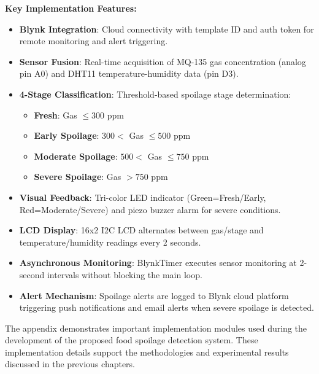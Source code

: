 \textbf{Key Implementation Features:}
\begin{itemize}
    \item \textbf{Blynk Integration}: Cloud connectivity with template ID and auth token for remote monitoring and alert triggering.
    \item \textbf{Sensor Fusion}: Real-time acquisition of MQ-135 gas concentration (analog pin A0) and DHT11 temperature-humidity data (pin D3).
    \item \textbf{4-Stage Classification}: Threshold-based spoilage stage determination:
    \begin{itemize}
        \item \textbf{Fresh}: Gas $\leq 300$ ppm
        \item \textbf{Early Spoilage}: $300 < $ Gas $\leq 500$ ppm
        \item \textbf{Moderate Spoilage}: $500 < $ Gas $\leq 750$ ppm
        \item \textbf{Severe Spoilage}: Gas $> 750$ ppm
    \end{itemize}
    \item \textbf{Visual Feedback}: Tri-color LED indicator (Green=Fresh/Early, Red=Moderate/Severe) and piezo buzzer alarm for severe conditions.
    \item \textbf{LCD Display}: 16x2 I2C LCD alternates between gas/stage and temperature/humidity readings every 2 seconds.
    \item \textbf{Asynchronous Monitoring}: BlynkTimer executes sensor monitoring at 2-second intervals without blocking the main loop.
    \item \textbf{Alert Mechanism}: Spoilage alerts are logged to Blynk cloud platform triggering push notifications and email alerts when severe spoilage is detected.
\end{itemize}

The appendix demonstrates important implementation modules used during the development of the proposed food spoilage detection system. These implementation details support the methodologies and experimental results discussed in the previous chapters.